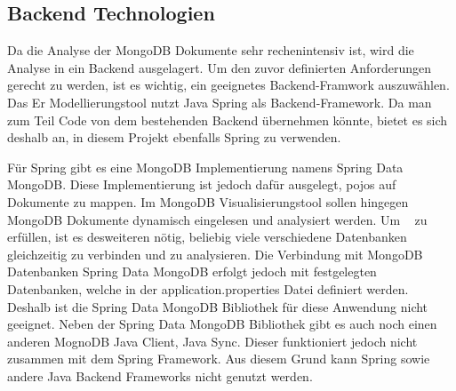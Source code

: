 \subsection{Backend Technologien}
\label{sec:verwendete_technologien_backend}

Da die Analyse der MongoDB Dokumente sehr rechenintensiv ist, wird die Analyse in ein Backend ausgelagert.
Um den zuvor definierten Anforderungen gerecht zu werden, ist es wichtig, ein geeignetes Backend-Framwork auszuwählen.
Das Er Modellierungstool nutzt Java Spring als Backend-Framework.
Da man zum Teil Code von dem bestehenden Backend übernehmen könnte, bietet es sich deshalb an, in diesem Projekt ebenfalls Spring zu verwenden.

Für Spring gibt es eine MongoDB Implementierung namens Spring Data MongoDB.
Diese Implementierung ist jedoch dafür ausgelegt, \ac{pojo}s auf Dokumente zu mappen.
Im MongoDB Visualisierungstool sollen hingegen MongoDB Dokumente dynamisch eingelesen und analysiert werden.
Um ~ zu erfüllen, ist es desweiteren nötig, beliebig viele verschiedene Datenbanken gleichzeitig zu verbinden und zu analysieren.
Die Verbindung mit MongoDB Datenbanken Spring Data MongoDB erfolgt jedoch mit festgelegten Datenbanken, welche in der application.properties Datei definiert werden.
~\autocite{spring:spring-data-mongodb}
Deshalb ist die Spring Data MongoDB Bibliothek für diese Anwendung nicht geeignet.
Neben der Spring Data MongoDB Bibliothek gibt es auch noch einen anderen MognoDB Java Client, Java Sync.
Dieser funktioniert jedoch nicht zusammen mit dem Spring Framework.
Aus diesem Grund kann Spring sowie andere Java Backend Frameworks nicht genutzt werden.

